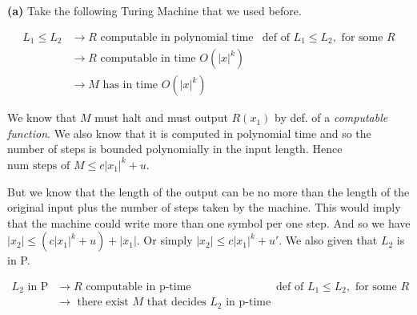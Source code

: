 \frmrule

\textbf{(a)} Take the following Turing Machine that we used before.



\[ 
\begin{array}{rll}
L_1 \leqslant L_2 &\rightarrow  R \text{ computable in polynomial time} 
& \text{def of } L_1 \leqslant L_2, \text{ for some } R \\
                  &\rightarrow  R \text{ computable in time } O(|x|^k) &\\
                  &\rightarrow  M \text{ has in time } O(|x|^k) &

\end{array}
\]

We know that $M$ must halt and must output $R(x_1)$ by def. of a \textit{computable function}. 
We also know that it is computed in polynomial time and so the number of steps is bounded 
polynomially in the input length. 
Hence $\text{num steps of } M \leqslant c|x_1|^k + u$. 

But we know that the length of the output can be 
no more than the length of the original input plus the number of steps taken 
by the machine. This would imply that the machine could write more than one symbol per one step.
And so we have $|x_2| \leqslant (c|x_1|^k + u) + |x_1|$.
Or simply $|x_2| \leqslant c|x_1|^k + u'$.
We also given that $L_2$ is in P. 

\[ 
\begin{array}{rll}
L_2 \text{ in P} & \rightarrow  R \text{ computable in p-time} 
                & \text{def of } L_1 \leqslant L_2, \text{ for some } R \\
                  &\rightarrow  \text{ there exist } M \text{ that decides } L_2 \text{ in p-time } &\\ 

\end{array}
\]

